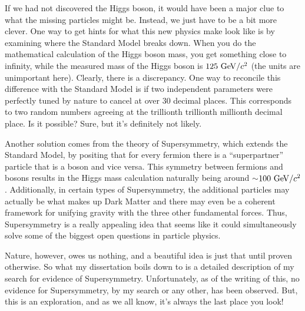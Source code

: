 If we had not discovered the Higgs boson, it would have been a major clue to what the missing particles might be. 
Instead, we just have to be a bit more clever.
One way to get hints for what this new physics make look like is by examining where the Standard Model breaks down.
When you do the mathematical calculation of the Higgs boson mass, you get something close to infinity, while the measured mass of the Higgs boson is $125~\mathrm{Ge\kern -0.1em V}/c^2$ (the units are unimportant here).
Clearly, there is a discrepancy.
One way to reconcile this difference with the Standard Model is if two independent parameters were perfectly tuned by nature to cancel at over 30 decimal places.
This corresponds to two random numbers agreeing at the trillionth trillionth millionth decimal place.
Is it possible? 
Sure, but it's definitely not likely.

Another solution comes from the theory of Supersymmetry, which extends the Standard Model, by positing that for every fermion there is a ``superpartner'' particle that is a boson and vice versa.
This symmetry between fermions and bosons results in the Higgs mass calculation naturally being around $\sim$$100~\mathrm{Ge\kern -0.1em V}/c^2$.
Additionally, in certain types of Supersymmetry, the additional particles may actually be what makes up Dark Matter and there may even be a coherent framework for unifying gravity with the three other fundamental forces.
Thus, Supersymmetry is a really appealing idea that seems like it could simultaneously solve some of the biggest open questions in particle physics.

Nature, however, owes us nothing, and a beautiful idea is just that until proven otherwise.
So what my dissertation boils down to is a detailed description of my search for evidence of Supersymmetry.
Unfortunately, as of the writing of this, no evidence for Supersymmetry, by my search or any other, has been observed.
But, this is an exploration, and as we all know, it's always the last place you look!
